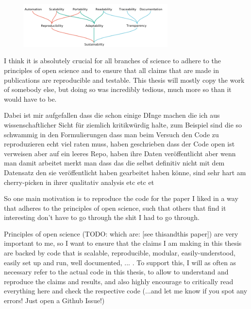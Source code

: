 \begin{figure}[H]
	\centering
	\includegraphics[width=0.7\textwidth]{graphics/stolenfigures/snakemake_aspect_hierachy.png}
\end{figure}


I think it is absolutely crucial for all branches of science to adhere to the principles of open science and to ensure that all claims that are made in publications are reproducible and testable. This thesis will mostly copy the work of somebody else, but doing so was incredibly tedious, much more so than it would have to be.

Dabei ist mir aufgefallen dass die schon einige DInge machen die ich aus wissenschaftlicher Sicht für ziemlich kritikwürdig halte, zum Beispiel sind die so schwammig in den Formulierungen dass man beim Versuch den Code zu reproduzieren echt viel raten muss, haben geschrieben dass der Code open ist verweisen aber auf ein leeres Repo, haben ihre Daten veröffentlicht aber wenn man damit arbeitet merkt man dass das die selbst definitiv nicht mit dem Datensatz den sie veröffentlicht haben gearbeitet haben könne, sind sehr hart am cherry-picken in ihrer qualitativ  analysis etc etc et

So one main motivation is to reproduce the code for the paper I liked in a way that adheres to the principles of open science, such that others that find it interesting don't have to go through the shit I had to go through.

Principles of open science (TODO: which are: [see thisandthis paper]) are very important to me, so I want to ensure that the claims I am making in this thesis are backed by code that is scalable, reproducible, modular, easily-understood, easily set up and run, well documented, ... . To support this, I will as often as necessary refer to the actual code in this thesis, to allow to understand and reproduce the claims and results, and also highly encourage to critically read everything here and check the respective code (...and let me know if you spot any errors! Just open a Github Issue!)


